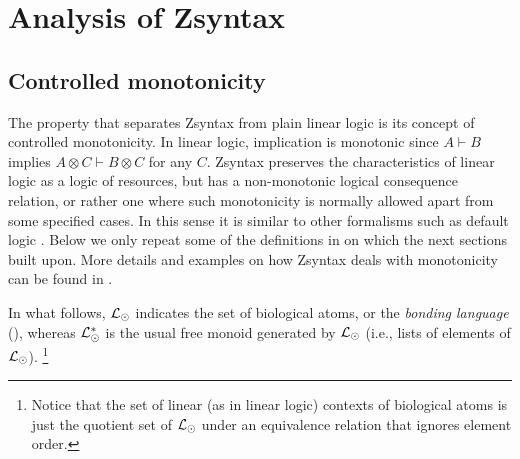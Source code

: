 \section{Analysis of Zsyntax}\label{sec:zsyntax}

\subsection{Controlled monotonicity}

The property that separates Zsyntax from plain linear logic is its concept of
controlled monotonicity. In linear logic, implication is monotonic since
$A \vdash B$ implies $A \otimes C \vdash B \otimes C$ for any $C$. Zsyntax
preserves the characteristics of linear logic as a logic of resources, but has a
non-monotonic logical consequence relation, or rather one where such
monotonicity is normally allowed apart from some specified cases. In this sense
it is similar to other formalisms such as default logic \cite{default}. Below we
only repeat some of the definitions in \cite{adding-logic} on which the next
sections built upon. More details and examples on how Zsyntax deals with monotonicity
can be found in \cite{adding-logic}.

In what follows, $\mathcal{L}_{\odot}$ indicates the set of biological atoms, or the
\emph{bonding language} (\cite{adding-logic}), whereas $\mathcal{L}_{\odot}^*$ is the
usual free monoid generated by $\mathcal{L}_{\odot}$ (i.e., lists of elements of
$\mathcal{L}_{\odot}$). \footnote{Notice that the set of linear (as in linear logic)
  contexts of biological atoms is just the quotient set of $\mathcal{L}_{\odot}$ under
  an equivalence relation that ignores element order.}

